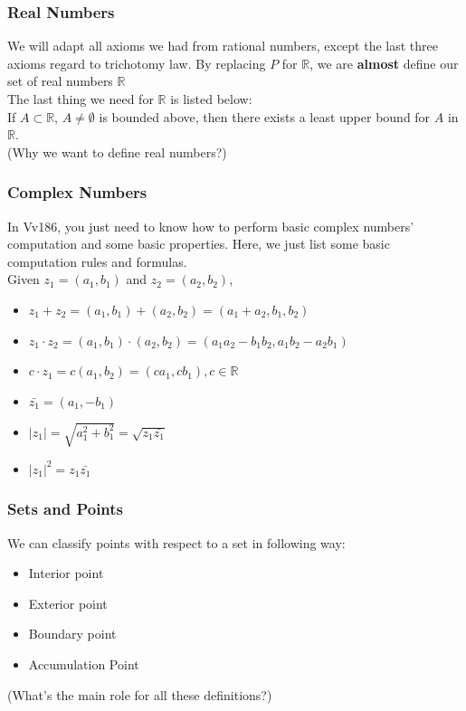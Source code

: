 \documentclass[12pt, t]{beamer}
\begin{document}
\begin{frame}
    \frametitle{Real Numbers}
    We will adapt all axioms we had from rational numbers, except the last three axioms
    regard to trichotomy law. By replacing $P$ for $\mathbb{R}$, we are \textbf{almost}
    define our set of real numbers $\mathbb{R}$\\
    \vspace{1em}
    The last thing we need for $\mathbb{R}$ is listed below:\\
    \vspace{1em}
    If $A\subset \mathbb{R}$, $A\neq \emptyset$ is bounded above, then there exists a least upper
    bound for $A$ in $\mathbb{R}$.\\
    \vspace{1em}
    (Why we want to define real numbers?)
\end{frame}

\begin{frame}
    \frametitle{Complex Numbers}
    In Vv186, you just need to know how to perform basic complex numbers' computation and some basic properties.
    Here, we just list some basic computation rules and formulas.\\
    Given $z_1=(a_1,b_1)$ and $z_2=(a_2,b_2)$,
    \begin{itemize}
        \item $z_1+z_2=(a_1,b_1)+(a_2,b_2)=(a_1+a_2,b_1,b_2)$
        \item $z_1\cdot z_2=(a_1,b_1)\cdot (a_2,b_2)=(a_1a_2-b_1b_2,a_1b_2-a_2b_1)$
        \item $c\cdot z_1=c(a_1,b_2)=(ca_1,cb_1), c\in \mathbb{R} $
        \item $\bar{z_1}=(a_1,-b_1)$
        \item $|z_1|=\sqrt{a_1^2+b_1^2}=\sqrt{z_1\bar{z_1}}$
        \item $|z_1|^2=z_1\bar{z_1}$
    \end{itemize}
\end{frame}

\begin{frame}
    \frametitle{Sets and Points}
    We can classify points with respect to a set in following way:
    \begin{itemize}
        \item Interior point
        \item Exterior point
        \item Boundary point
        \item Accumulation Point
    \end{itemize}
    (What's the main role for all these definitions?)
\end{frame}
\end{document}

